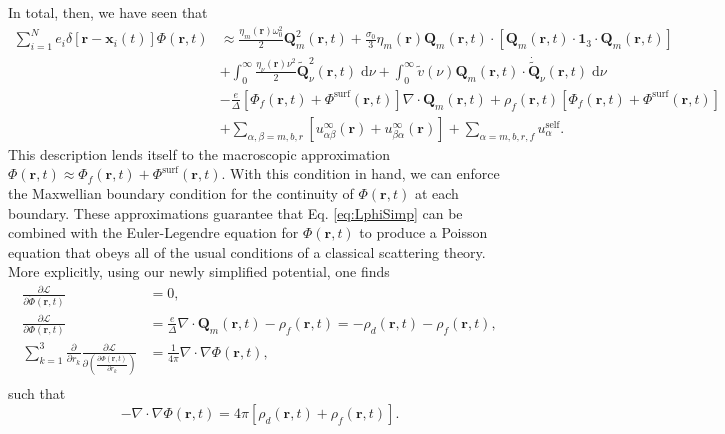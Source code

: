 \documentclass{article}
\begin{document}
In total, then, we have seen that
\begin{equation}\label{eq:LphiSimp}
\begin{split}
\sum_{i = 1}^Ne_i\delta[\mathbf{r} - \mathbf{x}_i(t)]\Phi(\mathbf{r},t) &\approx \frac{\eta_m(\mathbf{r})\omega_0^2}{2}\mathbf{Q}_m^2(\mathbf{r},t) + \frac{\sigma_0}{3}\eta_m(\mathbf{r})\mathbf{Q}_m(\mathbf{r},t)\cdot\left[\mathbf{Q}_m(\mathbf{r},t)\cdot\bm{1}_3\cdot\mathbf{Q}_m(\mathbf{r},t)\right]\\
&+ \int_0^\infty\frac{\eta_\nu(\mathbf{r})\nu^2}{2}\tilde{\mathbf{Q}}_\nu^2(\mathbf{r},t)\;\mathrm{d}\nu + \int_0^\infty \tilde{v}(\nu)\mathbf{Q}_m(\mathbf{r},t)\cdot\dot{\tilde{\mathbf{Q}}}_\nu(\mathbf{r},t)\;\mathrm{d}\nu\\
&-\frac{e}{\Delta}\left[\Phi_f(\mathbf{r},t) + \Phi^\mathrm{surf}(\mathbf{r},t)\right]\nabla\cdot\mathbf{Q}_m(\mathbf{r},t)+ \rho_f(\mathbf{r},t)\left[\Phi_f(\mathbf{r},t) + \Phi^\mathrm{surf}(\mathbf{r},t)\right]\\
&+ \sum_{\alpha,\beta = m,b,r}\left[u_{\alpha\beta}^\infty(\mathbf{r}) + u_{\beta\alpha}^\infty(\mathbf{r})\right] + \sum_{\alpha = m,b,r,f}u_\alpha^\mathrm{self}.
\end{split}
\end{equation}
This description lends itself to the macroscopic approximation $\Phi(\mathbf{r},t)\approx\Phi_f(\mathbf{r},t) + \Phi^\mathrm{surf}(\mathbf{r},t)$. With this condition in hand, we can enforce the Maxwellian boundary condition for the continuity of $\Phi(\mathbf{r},t)$ at each boundary. These approximations guarantee that Eq. \eqref{eq:LphiSimp} can be combined with the Euler-Legendre equation for $\Phi(\mathbf{r},t)$ to produce a Poisson equation that obeys all of the usual conditions of a classical scattering theory. More explicitly, using our newly simplified potential, one finds
\begin{equation}
\begin{split}
\frac{\partial\mathcal{L}}{\partial\dot{\Phi}(\mathbf{r},t)} &= 0,\\
\frac{\partial \mathcal{L}}{\partial \Phi(\mathbf{r},t)} &= \frac{e}{\Delta}\nabla\cdot\mathbf{Q}_m(\mathbf{r},t) - \rho_f(\mathbf{r},t) = -\rho_d(\mathbf{r},t) - \rho_f(\mathbf{r},t),\\
\sum_{k = 1}^3\frac{\partial}{\partial r_k}\frac{\partial \mathcal{L}}{\partial\left(\frac{\partial\Phi(\mathbf{r},t)}{\partial r_k}\right)} &= \frac{1}{4\pi}\nabla\cdot\nabla\Phi(\mathbf{r},t),\\
\end{split}
\end{equation}
such that
\begin{equation}\label{eq:poisson1}
-\nabla\cdot\nabla\Phi(\mathbf{r},t) = 4\pi\left[\rho_d(\mathbf{r},t) + \rho_f(\mathbf{r},t)\right].
\end{equation}
\end{document}
